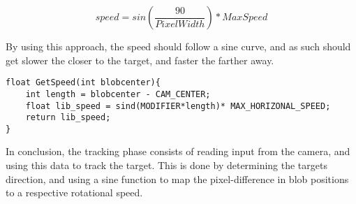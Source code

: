 \begin{equation}\label{sineF}
speed = sin(\frac{90}{PixelWidth})*MaxSpeed
\end{equation} 

By using this approach, the speed should follow a sine curve, and as such
should get slower the closer to the target, and faster the farther away.\nl

\begin{minipage}[H]{\linewidth}
\begin{lstlisting}[caption = Determine speed to rotate using a sine function, label = GetZeSpeed] 
float GetSpeed(int blobcenter){
    int length = blobcenter - CAM_CENTER;
    float lib_speed = sind(MODIFIER*length)* MAX_HORIZONAL_SPEED;
    return lib_speed;
}
\end{lstlisting}
\end{minipage}

In conclusion, the tracking phase consists of reading input from the camera, and
using this data to track the target. This is done by determining the targets
direction, and using a sine function to map the pixel-difference in blob
positions to a respective rotational speed.